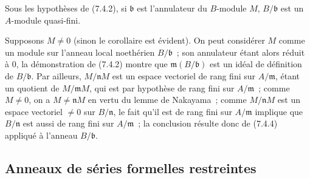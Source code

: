 \begin{corollary}[7.4.5]
\label{0.7.4.5-fr}
Sous les hypothèses de \textup{(7.4.2)}, si $\mathfrak b$ est l'annulateur du
$B$-module $M$, $B/\mathfrak b$ est un $A$-module quasi-fini.
\end{corollary}

Supposons $M\neq0$ (sinon le corollaire est évident). On peut considérer $M$
comme un module sur l'anneau local noethérien $B/\mathfrak b$~; son annulateur
étant alors réduit à $0$, la démonstration de (7.4.2) montre que
$\mathfrak m(B/\mathfrak b)$ est un idéal de définition de
$B/\mathfrak b$. Par ailleurs, $M/\mathfrak nM$ est un espace vectoriel de
rang fini sur $A/\mathfrak m$, étant un quotient de $M/\mathfrak mM$, qui est
par hypothèse de rang fini sur $A/\mathfrak m$~; comme $M\neq0$, on a
$M\neq\mathfrak nM$ en vertu du lemme de Nakayama~; comme
$M/\mathfrak nM$ est un espace vectoriel $\neq0$ sur $B/\mathfrak n$, le fait
qu'il est de rang fini sur $A/\mathfrak m$ implique que $B/\mathfrak n$ est
aussi de rang fini sur $A/\mathfrak m$~; la conclusion résulte donc de (7.4.4)
appliqué à l'anneau $B/\mathfrak b$.

\subsection{Anneaux de séries formelles restreintes}
\label{subsection:0.7.5-fr}

